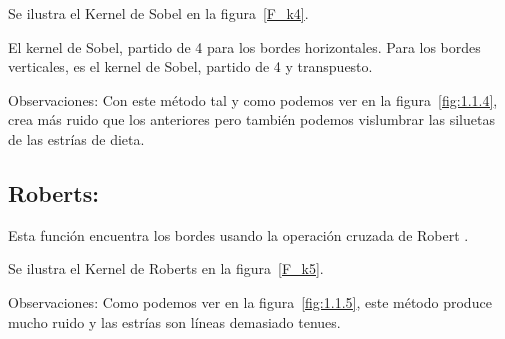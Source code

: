 Se ilustra el Kernel de Sobel en la figura~\ref{F_k4}.


El kernel de Sobel, partido de 4 para los bordes horizontales.
Para los bordes verticales, es el kernel de Sobel, partido de 4 y transpuesto. 

Observaciones: 
Con este método tal y como podemos ver en la figura~\ref{fig:1.1.4}, crea más ruido que los anteriores pero también podemos vislumbrar las siluetas de las estrías de dieta.


\subsection{Roberts:}

Esta función encuentra los bordes usando la operación cruzada de Robert \cite{wiki:Roberts}.

Se ilustra el Kernel de Roberts en la figura~\ref{F_k5}.




Observaciones:
Como podemos ver en la figura~\ref{fig:1.1.5}, este método produce mucho ruido y las estrías son líneas demasiado tenues.

